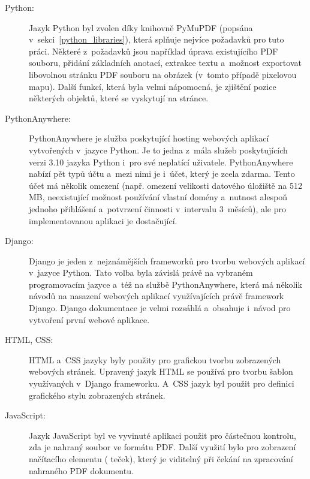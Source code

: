 \begin{description}
    \item[Python:] Jazyk Python byl zvolen díky knihovně PyMuPDF
    (popsána v~sekci~\ref{python_libraries}), která splňuje nejvíce požadavků
    pro tuto práci. Některé z~požadavků jsou například úprava existujícího PDF
    souboru, přidání základních anotací, extrakce textu a~možnost exportovat
    libovolnou stránku PDF souboru na obrázek (v~tomto případě pixelovou mapu).
    Další funkcí, která byla velmi nápomocná, je zjištění pozice některých
    objektů, které se vyskytují na stránce.

    \item[PythonAnywhere:] PythonAnywhere je služba poskytující hosting webových
    aplikací vytvořených v~jazyce Python. Je to jedna z~mála služeb poskytujících
    verzi 3.10 jazyka Python i~pro své neplatící uživatele. PythonAnywhere
    nabízí pět typů účtu a~mezi nimi je i~účet, který je zcela zdarma. Tento
    účet má několik omezení (např. omezení velikosti datového úložiště na
    512\,MB, neexistující možnost používání vlastní domény a~nutnost alespoň jednoho
    přihlášení a~potvrzení činnosti v~intervalu 3~měsíců), ale pro
    implementovanou aplikaci je dostačující.

    \item[Django:] Django je jeden z~nejznámějších frameworků pro tvorbu webových
    aplikací v~jazyce Python. Tato volba byla závislá právě na vybraném
    programovacím jazyce a~též na službě PythonAnywhere, která má několik
    návodů na nasazení webových aplikací využívajících právě framework Django.
    Django dokumentace je velmi rozsáhlá a~obsahuje i~návod pro vytvoření
    první webové aplikace.
    
    \item[HTML, CSS:] HTML a~CSS jazyky byly použity pro grafickou tvorbu
    zobrazených webových stránek. Upravený jazyk HTML se používá pro tvorbu
    šablon využívaných v~Django frameworku. A~CSS jazyk byl použit pro
    definici grafického stylu zobrazených stránek.
    
    \item[JavaScript:] Jazyk JavaScript byl ve vyvinuté aplikaci použit pro
    částečnou kontrolu, zda je nahraný soubor ve formátu PDF. Další využití
    bylo pro zobrazení načítacího elementu ( teček),
    který je viditelný při čekání na zpracování nahraného PDF dokumentu.
    
\end{description}



